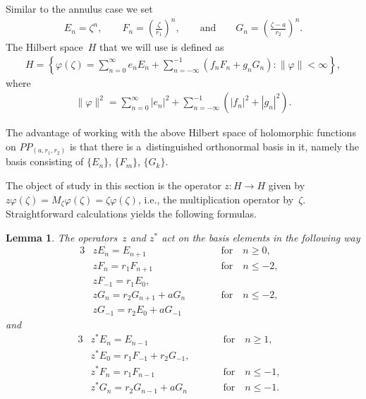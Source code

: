 \documentclass[pdftex]{sigma}
\numberwithin{equation}{section}
\newtheorem{Lemma}[Theorem]{Lemma}
\begin{document}
Similar to the annulus case we set
\begin{gather*}
E_n=\zeta^n,
\qquad
F_n =\left(\frac{\zeta}{r_1}\right)^n,
\qquad \text{and} \qquad
G_n=\left(\frac{\zeta-a}{r_2}\right)^n.
\end{gather*}
The Hilbert space~$H$ that we will use is def\/ined as
\begin{gather}
\label{Hilbert_space}
H=\left\{\varphi(\zeta)=\sum\limits_{n=0}^\infty e_nE_n+\sum\limits_{n=-\infty}^{-1}(f_nF_n+g_nG_n):
\|\varphi\|<\infty\right\},
\end{gather}
where
\begin{gather*}
\|\varphi\|^2=\sum\limits_{n=0}^\infty |e_n|^2+\sum\limits_{n=-\infty}^{-1}\left(|f_n|^2+|g_n|^2\right).
\end{gather*}

The advantage of working with the above Hilbert space of holomorphic functions on $PP_{(a, r_1,r_2)}$ is that there is
a~distinguished orthonormal basis in it, namely the basis consisting of $\{E_n\}$, $\{F_m\}$, $\{G_k\}$.

The object of study in this section is the operator $z:H \to H$ given by $z\varphi(\zeta)=M_\zeta \varphi(\zeta) =
\zeta \varphi(\zeta)$, i.e., the multiplication operator by~$\zeta$.
Straightforward calculations yields the following formulas.

\begin{Lemma}
The operators~$z$ and $z^*$ act on the basis elements in the following way
\begin{alignat*}{3}
& zE_n=E_{n+1} \qquad && \text{for} \quad n\ge 0,&
\\
& zF_n=r_1F_{n+1} \qquad && \text{for} \quad n\le -2, &
\\
& zF_{-1}=r_1E_0,&&&
\\
& zG_n=r_2G_{n+1}+aG_n \qquad && \text{for} \quad  n\le -2, &
\\
& zG_{-1}=r_2E_0+aG_{-1}&&&
\end{alignat*}
and
\begin{alignat*}{3}
& z^*E_n=E_{n-1} \qquad && \text{for} \quad  n\ge 1,&
\\
& z^*E_0=r_1F_{-1}+r_2G_{-1}, &&&
\\
& z^*F_n=r_1F_{n-1} \qquad && \text{for} \quad n\le -1,&
\\
& z^*G_n=r_2G_{n-1}+aG_n \qquad && \text{for} \quad n\le -1. &
\end{alignat*}
\end{Lemma}
\end{document}
